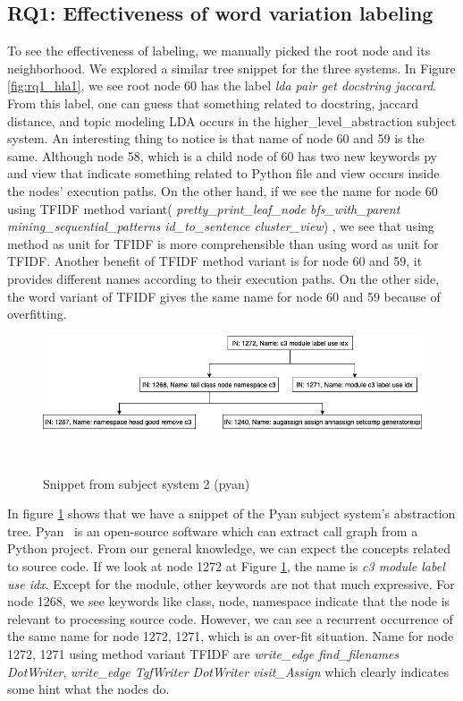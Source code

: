 \subsection{ RQ1: Effectiveness of word variation labeling}
To see the effectiveness of labeling, we manually picked the root node and its neighborhood. We explored a similar tree snippet for the three systems. In Figure \ref{fig:rq1_hla1}, we see root node 60 has the label \textit{lda pair get docstring jaccard}. From this label, one can guess that something related to docstring, jaccard distance, and topic modeling LDA occurs in the higher\_level\_abstraction subject system. An interesting thing to notice is that name of node 60 and 59 is the same. Although node 58, which is a child node of 60 has two new keywords py and view that indicate something related to Python file and view occurs inside the nodes' execution paths. On the other hand, if we see the name for node 60 using TFIDF method variant( \textit{pretty\_print\_leaf\_node bfs\_with\_parent mining\_sequential\_patterns id\_to\_sentence cluster\_view}) , we see that using method as unit for TFIDF is more comprehensible than using word as unit for TFIDF. Another benefit of TFIDF method variant is for node 60 and 59, it provides different names according to their execution paths. On the other side, the word variant of TFIDF gives the same name for node 60 and 59 because of over\-fitting. 

\begin{figure}[tb]
  \centering
  \includegraphics[width=\columnwidth]{figures/hla2/rq1_pyan1.png}
  \caption{Snippet from subject system 2 (pyan)}~\label{fig:rq1_pyan1}
\end{figure}

In figure \ref{fig:rq1_pyan1} shows that we have a snippet of the Pyan subject system's abstraction tree. Pyan~\cite{pyan} is an open-source software which can extract call graph from a Python project. From our general knowledge, we can expect the concepts related to source code. If we look at node 1272 at Figure \ref{fig:rq1_pyan1}, the name is \textit{c3 module label use idx}. Except for the module, other keywords are not that much expressive. For node 1268, we see keywords like class, node, namespace indicate that the node is relevant to processing source code. However, we can see a recurrent occurrence of the same name for node 1272, 1271, which is an over-fit situation. Name for node 1272, 1271 using method variant TFIDF are 
\textit{write\_edge  find\_filenames  DotWriter}, \textit{write\_edge TgfWriter DotWriter visit\_Assign}  which clearly indicates some hint what the nodes do. 

